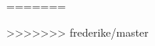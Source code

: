 \documentclass[pdftex, a4paper,11pt, twoside, UKenglish]{report}
\begin{document}
  
=======

>>>>>>> frederike/master
  
  
  
  
  
  \begin{thebibliography}{99}
    \scriptsize
    
  \end{thebibliography}
 
\end{document}
